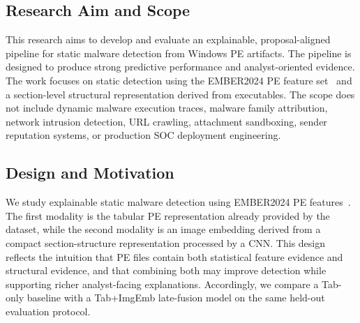 \documentclass[conference]{IEEEtran}
\begin{document}
\subsection{Research Aim and Scope}

This research aims to develop and evaluate an explainable, proposal-aligned pipeline for static malware detection from Windows PE artifacts.
The pipeline is designed to produce strong predictive performance and analyst-oriented evidence.
The work focuses on static detection using the EMBER2024 PE feature set~\cite{JMGPR2024} and a section-level structural representation derived from executables.
The scope does not include dynamic malware execution traces, malware family attribution, network intrusion detection, URL crawling, attachment sandboxing, sender reputation systems, or production SOC deployment engineering.

\subsection{Design and Motivation}

We study explainable static malware detection using EMBER2024 PE features~\cite{JMGPR2024}.
The first modality is the tabular PE representation already provided by the dataset, while the second modality is an image embedding derived from a compact section-structure representation processed by a CNN.
This design reflects the intuition that PE files contain both statistical feature evidence and structural evidence, and that combining both may improve detection while supporting richer analyst-facing explanations.
Accordingly, we compare a Tab-only baseline with a Tab+ImgEmb late-fusion model on the same held-out evaluation protocol.

% 
% 
% 
% 
\end{document}
